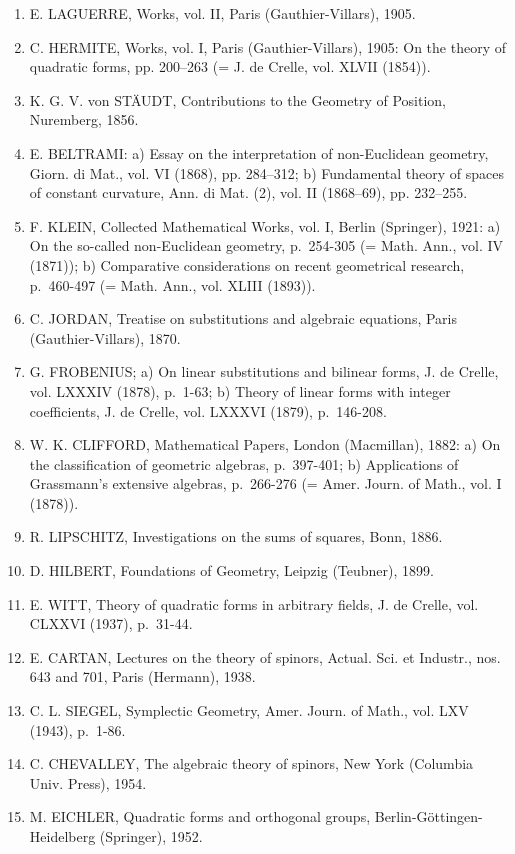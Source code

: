 \begin{enumerate}
\item
  E. LAGUERRE, Works, vol. II, Paris (Gauthier-Villars), 1905.
\item
  C. HERMITE, Works, vol. I, Paris (Gauthier-Villars), 1905: On the theory of quadratic forms, pp. 200–263 (= J. de Crelle, vol. XLVII (1854)).
\item
  K. G. V. von STÄUDT, Contributions to the Geometry of Position, Nuremberg, 1856.
\item
  E. BELTRAMI: a) Essay on the interpretation of non-Euclidean geometry, Giorn. di Mat., vol. VI (1868), pp. 284–312; b) Fundamental theory of spaces of constant curvature, Ann. di Mat. (2), vol. II (1868–69), pp. 232–255.
\item
  F. KLEIN, Collected Mathematical Works, vol. I, Berlin (Springer), 1921: a) On the so-called non-Euclidean geometry, p.~254-305 (= Math. Ann., vol. IV (1871)); b) Comparative considerations on recent geometrical research, p.~460-497 (= Math. Ann., vol. XLIII (1893)).
\item
  C. JORDAN, Treatise on substitutions and algebraic equations, Paris (Gauthier-Villars), 1870.
\item
  G. FROBENIUS; a) On linear substitutions and bilinear forms, J. de Crelle, vol. LXXXIV (1878), p.~1-63; b) Theory of linear forms with integer coefficients, J. de Crelle, vol. LXXXVI (1879), p.~146-208.
\item
  W. K. CLIFFORD, Mathematical Papers, London (Macmillan), 1882: a) On the classification of geometric algebras, p.~397-401; b) Applications of Grassmann's extensive algebras, p.~266-276 (= Amer. Journ. of Math., vol. I (1878)).
\item
  R. LIPSCHITZ, Investigations on the sums of squares, Bonn, 1886.
\item
  D. HILBERT, Foundations of Geometry, Leipzig (Teubner), 1899.
\item
  E. WITT, Theory of quadratic forms in arbitrary fields, J. de Crelle, vol. CLXXVI (1937), p.~31-44.
\item
  E. CARTAN, Lectures on the theory of spinors, Actual. Sci. et Industr., nos. 643 and 701, Paris (Hermann), 1938.
\item
  C. L. SIEGEL, Symplectic Geometry, Amer. Journ. of Math., vol. LXV (1943), p.~1-86.
\item
  C. CHEVALLEY, The algebraic theory of spinors, New York (Columbia Univ. Press), 1954.
\item
  M. EICHLER, Quadratic forms and orthogonal groups, Berlin-Göttingen-Heidelberg (Springer), 1952.
\end{enumerate}

